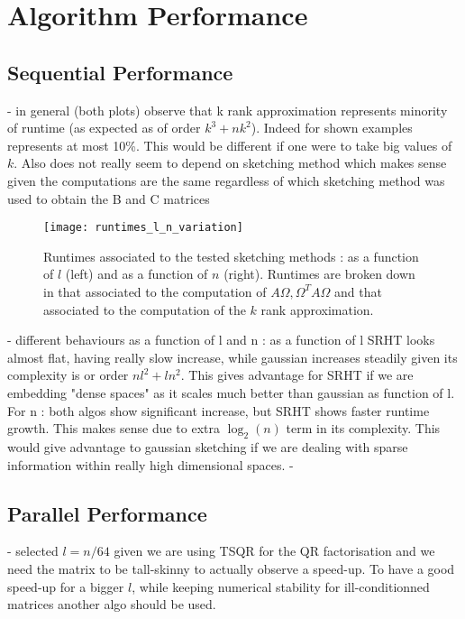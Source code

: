 \documentclass[a4paper, 12pt,oneside]{article}
\begin{document}
	\section{Algorithm Performance}
        \subsection{Sequential Performance}
		- in general (both plots) observe that k rank approximation represents minority of runtime (as expected as of order $k^3 +nk^2$). Indeed for shown examples represents at most 10\%. This would be different if one were to take big values of $k$. Also does not really seem to depend on sketching method which makes sense given the computations are the same regardless of which sketching method was used to obtain the B and C matrices
		\begin{figure}[htb]       
			\centering             
				\vspace{0em}
				\texttt{[image: runtimes\_l\_n\_variation]}
				\caption{Runtimes associated to the tested sketching methods : as a function of $l$ (left) and as a function of $n$ (right). Runtimes are broken down in that associated to the computation of $A\Omega,\Omega^T A\Omega$ and that associated to the computation of the $k$ rank approximation.}
				\label{fig:runtimes-l-n-variation}
		\end{figure}

		- different behaviours as a function of l and n : as a function of l SRHT looks almost flat, having really slow increase, while gaussian increases steadily given its complexity is or order $nl^2 + ln^2$. This gives advantage for SRHT if we are embedding "dense spaces" as it scales much better than gaussian as function of l. For n : both algos show significant increase, but SRHT shows faster runtime growth. This makes sense due to extra $\log_2(n)$ term in its complexity. This would give advantage to gaussian sketching if we are dealing with sparse information within really high dimensional spaces.
		- 
        \subsection{Parallel Performance}
		- selected $l=n/64$ given we are using TSQR for the QR factorisation and we need the matrix to be tall-skinny to actually observe a speed-up. To have a good speed-up for a bigger $l$, while keeping numerical stability for ill-conditionned matrices another algo should be used.
\end{document}
